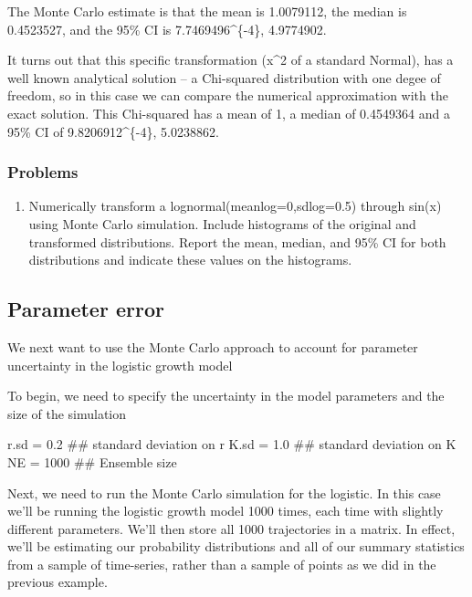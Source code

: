 \documentclass[]{article}
\newenvironment{Shaded}{\begin{snugshade}}{\end{snugshade}}
\newcommand{\DecValTok}[1]{\textcolor[rgb]{0.00,0.00,0.81}{#1}}
\newcommand{\FloatTok}[1]{\textcolor[rgb]{0.00,0.00,0.81}{#1}}
\newcommand{\StringTok}[1]{\textcolor[rgb]{0.31,0.60,0.02}{#1}}
\newcommand{\NormalTok}[1]{#1}
\providecommand{\tightlist}{%
  \setlength{\itemsep}{0pt}\setlength{\parskip}{0pt}}
\begin{document}
The Monte Carlo estimate is that the mean is 1.0079112, the median is
0.4523527, and the 95\% CI is 7.7469496\^{}\{-4\}, 4.9774902.

It turns out that this specific transformation (x\^{}2 of a standard
Normal), has a well known analytical solution -- a Chi-squared
distribution with one degee of freedom, so in this case we can compare
the numerical approximation with the exact solution. This Chi-squared
has a mean of 1, a median of 0.4549364 and a 95\% CI of
9.8206912\^{}\{-4\}, 5.0238862.

\subsubsection{Problems}\label{problems-2}

\begin{enumerate}
\def\labelenumi{\arabic{enumi}.}
\setcounter{enumi}{2}
\tightlist
\item
  Numerically transform a lognormal(meanlog=0,sdlog=0.5) through sin(x)
  using Monte Carlo simulation. Include histograms of the original and
  transformed distributions. Report the mean, median, and 95\% CI for
  both distributions and indicate these values on the histograms.
\end{enumerate}

\subsection{Parameter error}\label{parameter-error}

We next want to use the Monte Carlo approach to account for parameter
uncertainty in the logistic growth model

To begin, we need to specify the uncertainty in the model parameters and
the size of the simulation

\begin{Shaded}
\begin{Highlighting}[]
\NormalTok{r.sd =}\StringTok{ }\FloatTok{0.2}\NormalTok{     ## standard deviation on r}
\NormalTok{K.sd =}\StringTok{ }\FloatTok{1.0}\NormalTok{     ## standard deviation on K}
\NormalTok{NE =}\StringTok{ }\DecValTok{1000}\NormalTok{      ## Ensemble size}
\end{Highlighting}
\end{Shaded}

Next, we need to run the Monte Carlo simulation for the logistic. In
this case we'll be running the logistic growth model 1000 times, each
time with slightly different parameters. We'll then store all 1000
trajectories in a matrix. In effect, we'll be estimating our probability
distributions and all of our summary statistics from a sample of
time-series, rather than a sample of points as we did in the previous
example.
\end{document}

